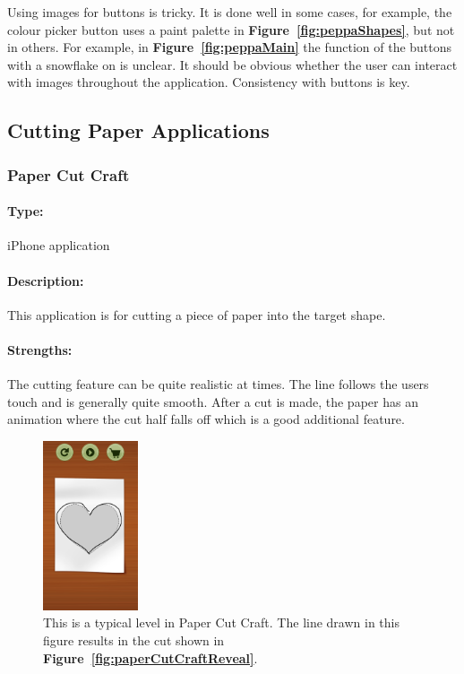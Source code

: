 \documentclass[11pt]{article}
\begin{document}
                Using images for buttons is tricky. It is done well in some cases, for example, the colour picker button uses a paint palette in \textbf{Figure~\ref{fig:peppaShapes}}, but not in others. For example, in \textbf{Figure~\ref{fig:peppaMain}} the function of the buttons with a snowflake on is unclear. It should be obvious whether the user can interact with images throughout the application. Consistency with buttons is key.
                
        \subsection{Cutting Paper Applications}
            \subsubsection{Paper Cut Craft}
            
                \paragraph{Type:} iPhone application \cite{PaperCutCraft}
                
                \paragraph{Description:} This application is for cutting a piece of paper into the target shape. 
                
                \paragraph{Strengths:}
                The cutting feature can be quite realistic at times. The line follows the users touch and is generally quite smooth. After a cut is made, the paper has an animation where the cut half falls off which is a good additional feature.
                
                \begin{figure}
                    \includegraphics[width=0.25\textwidth]{Images/paperCutCraftCut}
                    \caption{This is a typical level in Paper Cut Craft. The line drawn in this figure results in the cut shown in \textbf{Figure~\ref{fig:paperCutCraftReveal}}.}
                    \label{fig:paperCutCraftCut}
                \end{figure}
                
\end{document}
